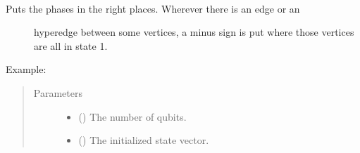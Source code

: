 \documentclass[letterpaper,10pt,english]{sphinxmanual}
\begin{document}

\begin{fulllineitems}
\label{\detokenize{hypergraphstates-opti:mermin_on_qiskit.hypergraphstates_optimization.hypergraphstates.hyperedges_computation}}~\begin{description}
\item[{Puts the phases in the right places. Wherever there is an edge or an }] \leavevmode
hyperedge between some vertices, a minus sign is put where those 
vertices are all in state 1.

\item[{Example:}] \leavevmode
\begin{sphinxVerbatim}[commandchars=\\\{\}]
 \PYG{p}{[}   \PYG{p}{]} \PYG{p}{[}\PYG{p}{[}\PYG{p}{]}\PYG{p}{]}
\end{sphinxVerbatim}

\end{description}
\begin{quote}\begin{description}
\item[{Parameters}] \leavevmode\begin{itemize}
\item {} 
 () \textendash{} The number of qubits.

\item {} 
 (\sphinxstyleliteralemphasis{\sphinxupquote{(}}\sphinxstyleliteralemphasis{\sphinxupquote{)}}) \textendash{} The initialized state vector.


\end{itemize}
\end{description}
\end{quote}
\end{fulllineitems}
\end{document}
